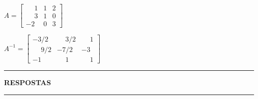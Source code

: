 \documentclass[12pt]{exam}
\begin{document}
\begin{exercicio}\label{matrizinversafim}
  $
    A =\begin{bmatrix}
        \phantom{-} 1 & 1 & 2\\
        \phantom{-} 3 & 1 & 0\\
        -2 & 0 & 3
    \end{bmatrix}
  $
  \begin{solucao}
    $
      A^{-1} =\begin{bmatrix}
        -3/2 & \phantom{-} 3/2 & \phantom{-} 1\\
        \phantom{-} 9/2 & -7/2 & -3\\
        -1 & \phantom{-} 1 & \phantom{-} 1
      \end{bmatrix}
    $
  \end{solucao}
\end{exercicio}

\newpage
{}
\hrule
\begin{center}
{\large\bf RESPOSTAS}
\end{center}
\hrule

\end{document}
